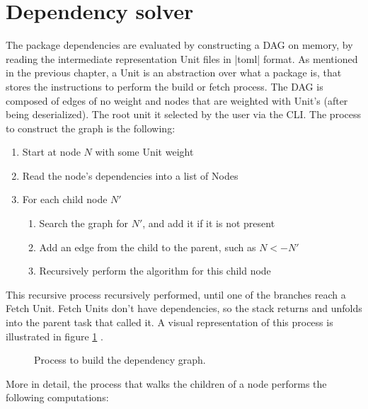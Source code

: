 \section{Dependency solver}

The package dependencies are evaluated by constructing a
\acl{DAG} on memory, by reading the intermediate
representation Unit files in |toml| format. As mentioned in
the previous chapter, a Unit is an abstraction over what a
package is, that stores the instructions to perform the build
or fetch process. The \ac{DAG} is
composed of edges of no weight and nodes that are weighted
with Unit's (after being deserialized). The root unit it
selected by the user via the \ac{CLI}. The process to
construct the graph is the following:

\begin{enumerate}
    \item Start at node $N$ with some Unit weight
    \item Read the node's dependencies into a list of Nodes
    \item For each child node $N'$
    \begin{enumerate}
        \item Search the graph for $N'$, and add it if it is
        not present
        \item Add an edge from the child to the parent, such as $N <- N'$
        \item Recursively perform the algorithm for this
        child node
    \end{enumerate}
\end{enumerate}

This recursive process recursively performed, until one of
the branches reach a Fetch Unit. Fetch Units don't have
dependencies, so the stack returns and unfolds into the
parent task that called it. A visual representation of this
process is illustrated in figure \ref{fig:depbuild} .

\begin{figure}[hbt]
    \centerfloat
    
    \caption{Process to build the dependency graph.}
    \label{fig:depbuild}
\end{figure}

More in detail, the process that walks the children of a node
performs the following computations:

